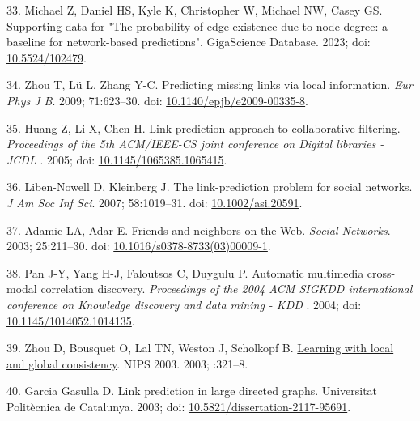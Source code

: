 \begin{CSLReferences}{0}{0}
\leavevmode{}%
33. Michael Z, Daniel HS, Kyle K, Christopher W, Michael NW, Casey GS. Supporting data for "The probability of edge existence due to node degree: a baseline for network-based predictions". GigaScience Database. 2023; doi: \href{https://doi.org/10.5524/102479}{10.5524/102479}.

\leavevmode{}%
34. Zhou T, Lü L, Zhang Y-C. Predicting missing links via local information. \emph{Eur Phys J B}. 2009; 71:623--30. doi: \href{https://doi.org/10.1140/epjb/e2009-00335-8}{10.1140/epjb/e2009-00335-8}.

\leavevmode{}%
35. Huang Z, Li X, Chen H. Link prediction approach to collaborative filtering. \emph{Proceedings of the 5th ACM/IEEE-CS joint conference on Digital libraries - JCDL }. 2005; doi: \href{https://doi.org/10.1145/1065385.1065415}{10.1145/1065385.1065415}.

\leavevmode{}%
36. Liben-Nowell D, Kleinberg J. The link-prediction problem for social networks. \emph{J Am Soc Inf Sci}. 2007; 58:1019--31. doi: \href{https://doi.org/10.1002/asi.20591}{10.1002/asi.20591}.

\leavevmode{}%
37. Adamic LA, Adar E. Friends and neighbors on the Web. \emph{Social Networks}. 2003; 25:211--30. doi: \href{https://doi.org/10.1016/s0378-8733(03)00009-1}{10.1016/s0378-8733(03)00009-1}.

\leavevmode{}%
38. Pan J-Y, Yang H-J, Faloutsos C, Duygulu P. Automatic multimedia cross-modal correlation discovery. \emph{Proceedings of the 2004 ACM SIGKDD international conference on Knowledge discovery and data mining - KDD }. 2004; doi: \href{https://doi.org/10.1145/1014052.1014135}{10.1145/1014052.1014135}.

\leavevmode{}%
39. Zhou D, Bousquet O, Lal TN, Weston J, Scholkopf B. \href{https://dl.acm.org/doi/10.5555/2981345.2981386}{Learning with local and global consistency}. NIPS 2003. 2003; :321--8.

\leavevmode{}%
40. Garcia Gasulla D. Link prediction in large directed graphs. Universitat Politècnica de Catalunya. 2003; doi: \href{https://doi.org/10.5821/dissertation-2117-95691}{10.5821/dissertation-2117-95691}.

\end{CSLReferences}

